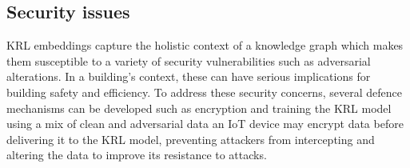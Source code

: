 \subsection{Security issues}
\ac{KRL} embeddings capture the holistic context of a knowledge graph which makes them susceptible to a variety of security vulnerabilities such as adversarial alterations. In a building's context, these can have serious implications for building safety and efficiency. To address these security concerns, several defence mechanisms can be developed such as encryption and training the \ac{KRL} model using a mix of clean and adversarial data an IoT device may encrypt data before delivering it to the \ac{KRL} model, preventing attackers from intercepting and altering the data to improve its resistance to attacks.






